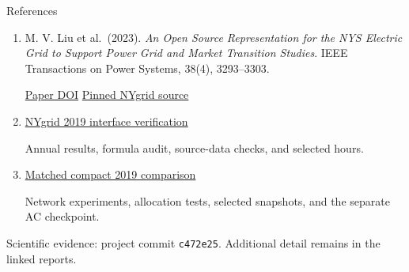 \documentclass[aspectratio=169,10pt]{beamer}
\newcommand{\minor}[1]{{\small\color{muted}#1}\par}
\begin{document}
\begin{frame}{References}
\begin{enumerate}\setlength{\itemsep}{1.3em}
\item M. V. Liu et al.\ (2023). \emph{An Open Source Representation for the NYS Electric Grid to Support Power Grid and Market Transition Studies}. IEEE Transactions on Power Systems, 38(4), 3293--3303.\par
\href{https://doi.org/10.1109/TPWRS.2022.3200887}{Paper DOI}\qquad
\href{https://github.com/AndersonEnergyLab-Cornell/NYgrid/tree/47698b6c7823ae7b1bc6935e5601d5b64b8f918e}{Pinned NYgrid source}
\item \href{https://github.com/yifeihsu/nyiso-dlr-testbed/blob/c472e250753b441223d8c6e029aa86e6dd56db8e/NYGRID_2019_INTERFACE_VERIFICATION.md}{NYgrid 2019 interface verification}\par
Annual results, formula audit, source-data checks, and selected hours.
\item \href{https://github.com/yifeihsu/nyiso-dlr-testbed/blob/c472e250753b441223d8c6e029aa86e6dd56db8e/NYGRID_COMPACT_2019_COMPARISON.md}{Matched compact 2019 comparison}\par
Network experiments, allocation tests, selected snapshots, and the separate AC checkpoint.
\end{enumerate}
\vfill
\minor{Scientific evidence: project commit \texttt{c472e25}. Additional detail remains in the linked reports.}
\end{frame}
\end{document}
